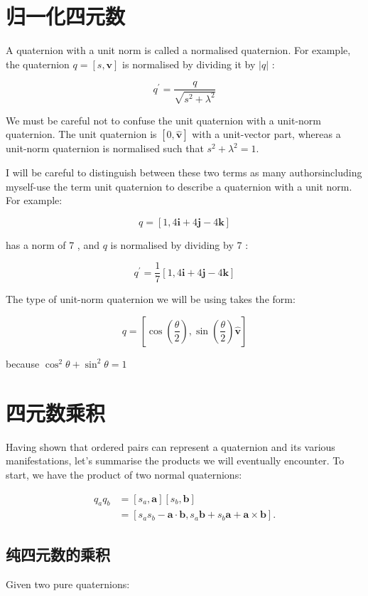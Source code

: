 \section{归一化四元数}
A quaternion with a unit norm is called a normalised quaternion. For example, the quaternion $q=[s, \mathbf{v}]$ is normalised by dividing it by $|q|$ :

$$
    q^{\prime}=\frac{q}{\sqrt{s^{2}+\lambda^{2}}}
$$

We must be careful not to confuse the unit quaternion with a unit-norm quaternion. The unit quaternion is $[0, \hat{\mathbf{v}}]$ with a unit-vector part, whereas a unit-norm quaternion is normalised such that $s^{2}+\lambda^{2}=1$.

I will be careful to distinguish between these two terms as many authorsincluding myself-use the term unit quaternion to describe a quaternion with a unit norm. For example:

$$
    q=[1,4 \mathbf{i}+4 \mathbf{j}-4 \mathbf{k}]
$$

has a norm of 7 , and $q$ is normalised by dividing by 7 :

$$
    q^{\prime}=\frac{1}{7}[1,4 \mathbf{i}+4 \mathbf{j}-4 \mathbf{k}]
$$

The type of unit-norm quaternion we will be using takes the form:

$$
    q=\left[\cos \left(\frac{\theta}{2}\right), \sin \left(\frac{\theta}{2}\right) \hat{\mathbf{v}}\right]
$$

because $\cos ^{2} \theta+\sin ^{2} \theta=1$

\section{四元数乘积}
Having shown that ordered pairs can represent a quaternion and its various manifestations, let's summarise the products we will eventually encounter. To start, we have the product of two normal quaternions:

$$
    \begin{aligned}
        q_{a} q_{b} & =\left[s_{a}, \mathbf{a}\right]\left[s_{b}, \mathbf{b}\right]                                                           \\
                    & =\left[s_{a} s_{b}-\mathbf{a} \cdot \mathbf{b}, s_{a} \mathbf{b}+s_{b} \mathbf{a}+\mathbf{a} \times \mathbf{b}\right] .
    \end{aligned}
$$

\subsection{纯四元数的乘积}
Given two pure quaternions:

